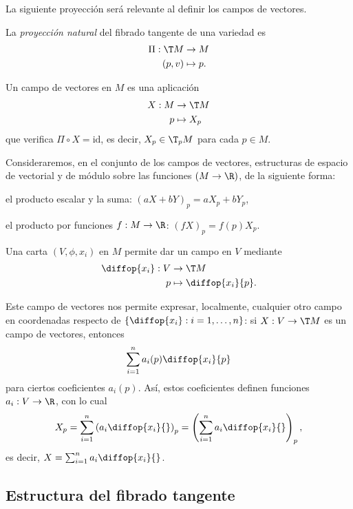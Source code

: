 La siguiente proyección será relevante al definir los campos de vectores.
\begin{ndef}
  La \emph{proyección natural} del fibrado tangente de una variedad es
  \begin{alignat*}{2}
    \Pi: \T M & \to M \\
   (p,v) & \mapsto p.
  \end{alignat*}
\end{ndef}

\begin{ndef}
  Un campo de vectores en $M$ es una aplicación
  \begin{alignat*}{2}
    X: M & \to \T M \\
   p & \mapsto X_{p}
  \end{alignat*}
  que verifica $\Pi\circ X=\mathrm{id}$, es decir, $X_{p}\in \T_{p}M$ para cada
  $p\in M$.
\end{ndef}

Consideraremos, en el conjunto de los campos de vectores, estructuras de espacio
de vectorial y de módulo sobre las funciones $(M\to \R)$, de la siguiente forma:
\begin{nlist}
\item
  el producto escalar y la suma: $(aX+bY)_{p} = aX_{p}+bY_{p}$,
\item
  el producto por funciones $f: M\to\R$: $(fX)_{p} = f(p)X_{p}$.
\end{nlist}

\begin{ejemplo}
  Una carta $(V,\phi,x_{i})$ en $M$ permite dar un campo en $V$ mediante
  \begin{alignat*}{2}
    \diffop{x_{i}}: V  & \to \T M \\
    p & \mapsto \diffop{x_{i}}{p}.
  \end{alignat*}
\end{ejemplo}
Este campo de vectores nos permite expresar, localmente, cualquier otro campo en
coordenadas respecto de $\left\{ \diffop{x_{i}} : i=1,\dots,n \right\}$: si $X:
V \to \T M$ es un campo de vectores, entonces
\[
  \sum_{i=1}^{n} a_{i}(p)\diffop{x_{i}}{p}
\]
para ciertos coeficientes $a_{i}(p)$. Así, estos coeficientes definen funciones
$a_{i}: V\to\R$, con lo cual
\[
  X_{p} = \sum_{i=1}^{n}\left( a_{i}\diffop{x_{i}}{} \right)_{p} = \left(
    \sum_{i=1}^{n} a_{i} \diffop{x_{i}}{} \right)_{p}
,\]
es decir, $X = \sum_{i=1}^{n}a_{i}\diffop{x_{i}}{}$.

\subsection{Estructura del fibrado tangente}

